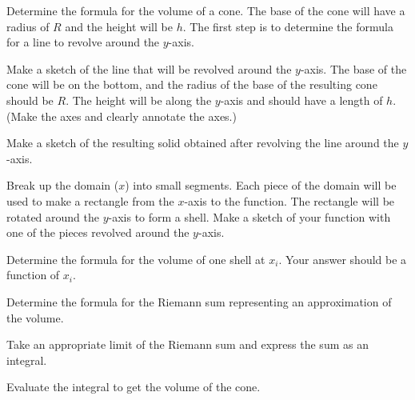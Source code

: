 \begin{problem}
  \item Determine the formula for the volume of a cone.
      The base of the cone will have a radius of $R$ and the height will be $h$.
      The first step is to determine the formula for a line to revolve around the $y$-axis.
    \begin{subproblem}
      \item
        Make a sketch of the line that will be revolved around the $y$-axis.
        The base of the cone will be on the bottom, and the radius of the base of the resulting cone should be $R$.
        The height will be along the $y$-axis and should have a length of $h$.
        (Make the axes and clearly annotate the axes.)
        \vfill

      \item Make a sketch of the resulting solid obtained after
        revolving the line around the $y$-axis.
        \vfill

      \item Break up the domain ($x$) into small segments. Each piece
        of the domain will be used to make a rectangle from the
        $x$-axis to the function. The rectangle will be rotated around
        the $y$-axis to form a shell.  Make a sketch of your function
        with one of the pieces revolved around the $y$-axis.  \vfill

      \clearpage

      \item Determine the formula for the volume of one shell at $x_i$. Your answer should be a function of $x_i$.
        \vfill

      \item Determine the formula for the Riemann sum representing an approximation of the volume.
        \vfill

      \item Take an appropriate limit of the Riemann sum and express the sum as an integral.
        \vfill

      \item Evaluate the integral to get the volume of the cone.
        \vfill

    \end{subproblem}

    \clearpage


\end{problem}
